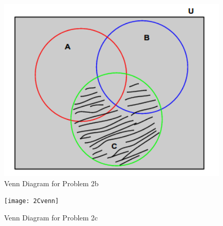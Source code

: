 \documentclass[a4paper,11pt]{article}
\begin{document}
    \begin{figure}
     \includegraphics[width=4.4in]{2Bvenn}
   \caption{Venn Diagram for Problem 2b}
   \label{fig:tutorial}
  \end{figure} 

    \begin{figure}
     \texttt{[image: 2Cvenn]}
   \caption{Venn Diagram for Problem 2c}
   \label{fig:tutorial}
  \end{figure} 
\end{document}
